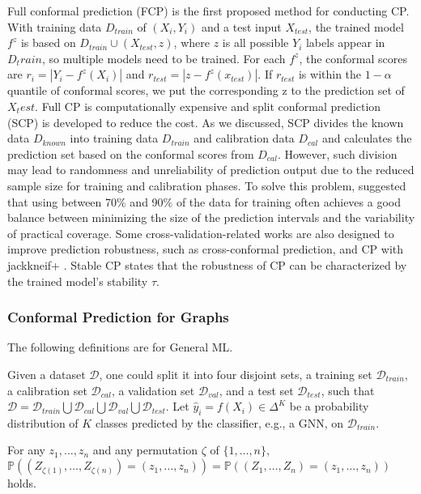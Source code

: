 Full conformal prediction (FCP) is the first proposed method for conducting CP. With training data $D_{train}$ of $(X_i,Y_i)$ and a test input $X_{test}$, the trained model $f^z$ is based on $D_{train}\cup (X_{test},z) $, where $z$ is all possible $Y_i$ labels appear in $D_train$, so multiple models need to be trained. For each $f^z$, the conformal scores are $r_i=|Y_i-f^z(X_i)|$ and $r_{test}=|z-f^z(x_{test})|$. If $r_{test}$ is within the $1-\alpha$ quantile of conformal scores, we put the corresponding z to the prediction set of $X_test$. Full CP is computationally expensive and split conformal prediction (SCP) is developed to reduce the cost. As we discussed, SCP divides the known data $D_{known}$ into training data $D_{train}$ and calibration data $D_{cal}$ and calculates the prediction set based on the conformal scores from $D_{cal}$. However, such division may lead to randomness and unreliability of prediction output due to the reduced sample size for training and calibration phases. To solve this problem, \cite{Sesia2019ACO} suggested that using between 70$\%$ and 90$\%$ of the data for training often achieves a good balance between minimizing the size of the prediction intervals and the variability of practical coverage. Some cross-validation-related works are also designed to improve prediction robustness, such as cross-conformal prediction\cite{Vovk2012CrossconformalP}, and CP with jackkneif+ \cite{Barber2019PredictiveIW}. Stable CP \cite{ndiaye2022stable} states that the robustness of CP can be characterized by the trained model's stability $\tau$. 
\subsubsection{Conformal Prediction for Graphs}
The following definitions are for General ML.

Given a dataset $\mathcal{D}$, one could split it into four disjoint sets, a training set $\mathcal{D}_{train}$, a calibration set $\mathcal{D}_{cal}$, a validation set $\mathcal{D}_{val}$, and a test set $\mathcal{D}_{test}$, such that $\mathcal{D} = \mathcal{D}_{train} \bigcup \mathcal{D}_{cal} \bigcup \mathcal{D}_{val} \bigcup \mathcal{D}_{test}$.
Let $\hat{y}_i= f(X_i) \in \Delta^K$ be a probability distribution of $K$ classes predicted by the classifier, e.g., a GNN, on $\mathcal{D}_{train}$.
% 

\begin{definition}[Exchangeability]
\label{def:exchangeability}
    For any $z_1, \dots, z_n$ and any permutation $\zeta$ of $\{1, \dots, n\}$, 
    $\mathbb{P} \left( (Z_{\zeta(1)}, \dots, Z_{\zeta(n)}) = (z_1, \dots, z_n) \right) = 
    \mathbb{P} \left( (Z_1, \dots, Z_n) = (z_1, \dots, z_n) \right)$ holds. 
\end{definition}

